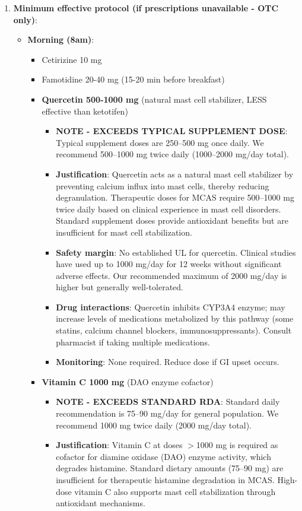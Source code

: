 \begin{enumerate}
    \item \textbf{Minimum effective protocol (if prescriptions unavailable - OTC only)}:
    \begin{itemize}
        \item \textbf{Morning (8am)}:
        \begin{itemize}
            \item Cetirizine 10 mg
            \item Famotidine 20-40 mg (15-20 min before breakfast)
            \item \textbf{Quercetin 500-1000 mg} (natural mast cell stabilizer, LESS effective than ketotifen)
            \begin{itemize}
                \item \textbf{NOTE - EXCEEDS TYPICAL SUPPLEMENT DOSE}: Typical supplement doses are 250--500 mg once daily. We recommend 500--1000 mg twice daily (1000--2000 mg/day total).
                \item \textbf{Justification}: Quercetin acts as a natural mast cell stabilizer by preventing calcium influx into mast cells, thereby reducing degranulation. Therapeutic doses for MCAS require 500--1000 mg twice daily based on clinical experience in mast cell disorders. Standard supplement doses provide antioxidant benefits but are insufficient for mast cell stabilization.
                \item \textbf{Safety margin}: No established UL for quercetin. Clinical studies have used up to 1000 mg/day for 12 weeks without significant adverse effects. Our recommended maximum of 2000 mg/day is higher but generally well-tolerated.
                \item \textbf{Drug interactions}: Quercetin inhibits CYP3A4 enzyme; may increase levels of medications metabolized by this pathway (some statins, calcium channel blockers, immunosuppressants). Consult pharmacist if taking multiple medications.
                \item \textbf{Monitoring}: None required. Reduce dose if GI upset occurs.
            \end{itemize}
            \item \textbf{Vitamin C 1000 mg} (DAO enzyme cofactor)
            \begin{itemize}
                \item \textbf{NOTE - EXCEEDS STANDARD RDA}: Standard daily recommendation is 75--90 mg/day for general population. We recommend 1000 mg twice daily (2000 mg/day total).
                \item \textbf{Justification}: Vitamin C at doses $>$1000 mg is required as cofactor for diamine oxidase (DAO) enzyme activity, which degrades histamine. Standard dietary amounts (75--90 mg) are insufficient for therapeutic histamine degradation in MCAS. High-dose vitamin C also supports mast cell stabilization through antioxidant mechanisms.

\end{itemize}
\end{itemize}
\end{itemize}
\end{enumerate}
